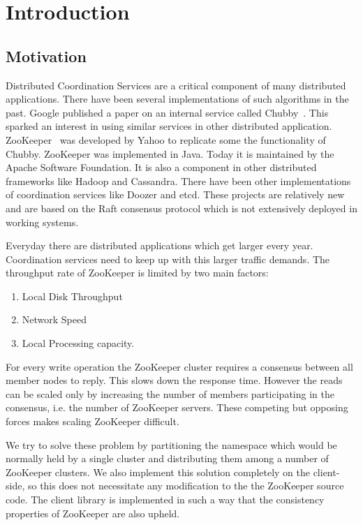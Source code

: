 \chapter{Introduction}

\section{Motivation}

Distributed Coordination Services are a critical component of many distributed applications. There have been several implementations of such algorithms in the past. Google published a paper on an internal service called Chubby~\cite{burrows2006chubby}. This sparked an interest in using similar services in other distributed application. ZooKeeper~\cite{hunt2010zookeeper} was developed by Yahoo to replicate some the functionality of Chubby. ZooKeeper was implemented in Java. Today it is maintained by the Apache Software Foundation. It is also a component in other distributed frameworks like Hadoop and Cassandra. There have been other implementations of coordination services like Doozer and etcd. These projects are relatively new and are based on the Raft consensus protocol which is not extensively deployed in working systems. 

Everyday there are distributed applications which get larger every year. Coordination services need to keep up with this larger traffic demands. The throughput rate of ZooKeeper is limited by two main factors:
\begin{enumerate}
  \item Local Disk Throughput
  \item Network Speed
  \item Local Processing capacity.
\end{enumerate}

For every write operation the ZooKeeper cluster requires a consensus between all member nodes to reply. This slows down the response time. However the reads can be scaled only by increasing the number of members participating in the consensus, i.e. the number of ZooKeeper servers. These competing but opposing forces makes scaling ZooKeeper difficult. 

We try to solve these problem by partitioning the namespace which would be normally held by a single cluster and distributing them among a number of ZooKeeper clusters. We also implement this solution completely on the client-side, so this does not necessitate any modification to the the ZooKeeper source code. The client library is implemented in such a way that the consistency properties of ZooKeeper are also upheld.

